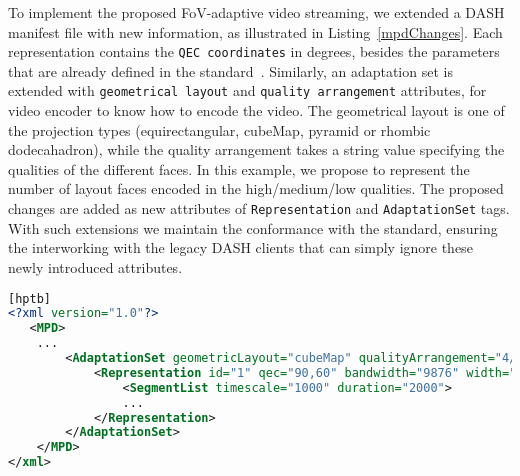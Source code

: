 

 To implement the proposed FoV-adaptive video streaming, we extended a DASH manifest file with new information, as illustrated in Listing~\ref{mpdChanges}. Each representation contains the \texttt{QEC coordinates} in degrees, besides the parameters that are already defined in the standard~\cite{iso_iec}. Similarly, an adaptation set is extended with \texttt{geometrical layout} and \texttt{quality arrangement} attributes, for video encoder to know how to encode the video. The geometrical layout is one of the projection types (equirectangular, cubeMap, pyramid or rhombic dodecahadron), while the quality arrangement takes a string value specifying the qualities of the different faces. In this example, we propose to represent the number of layout faces encoded in the high/medium/low qualities. The proposed changes are added as new attributes of \texttt{Representation} and \texttt{AdaptationSet} tags. With such extensions we maintain the conformance with the standard, ensuring the interworking with the legacy DASH clients that can simply ignore these newly introduced attributes.

\begin{lstlisting}[language=xml, frame=single, backgroundcolor=\color{white}, caption=Extensions of MPD file, label=mpdChanges][hptb]
<?xml version="1.0"?>
   <MPD>
    ...
        <AdaptationSet geometricLayout="cubeMap" qualityArrangement="4/1/1">
            <Representation id="1" qec="90,60" bandwidth="9876" width="1920" height="1080" frameRate="30">
                <SegmentList timescale="1000" duration="2000">
                ...
            </Representation>
        </AdaptationSet>
    </MPD>
</xml>
\end{lstlisting}



